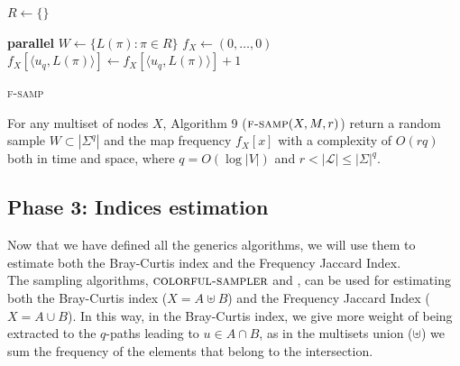 \begin{algorithm}[h]
	\small
	\DontPrintSemicolon
	$R \gets \{\}$\;
	
	\BlankLine
	\textbf{parallel} 
	\BlankLine
	$W \gets \{ L(\pi) : \pi \in R \}$\;
	\BlankLine
	$f_X \gets (0,\ldots,0)$\;
	{
		$f_X[\langle u_{q}, L(\pi) \rangle ] \gets f_X[\langle u_{q}, L(\pi) \rangle]+1$
	}
	\BlankLine
	\caption{\textsc{f-samp}}
	\label{alg:randomsample}
	\label{alg:sample}
\end{algorithm}

\begin{lemma}
	For any multiset of nodes $X$, 
	Algorithm 9 ($\textsc{f-samp}(X, M, r)$) return a random sample $W \subset |\Sigma^{q}|$ and the map frequency $f_{X}[x]$
	with a complexity of $O(rq)$ both in time and space, 
	where $q = O(\log |V|)$ and $r < |\mathcal{L}| \leq |\Sigma|^{q}$.
\end{lemma}

\clearpage

\subsection*{Phase 3: Indices estimation}

Now that we have defined all the generics algorithms, 
we will use them to estimate both the Bray-Curtis index and the Frequency Jaccard Index.\\

The sampling algorithms, $\textsc{colorful-sampler}$ and \fsamp, can be used for estimating both the Bray-Curtis index ($X = A \uplus B$) and
the Frequency Jaccard Index ($X = A \cup B$).
In this way, in the Bray-Curtis index, we give more weight of being extracted to the $q$-paths leading to $u \in A \cap B$,
as in the multisets union ($\uplus$) we sum the frequency of the elements that belong to the intersection.\\

